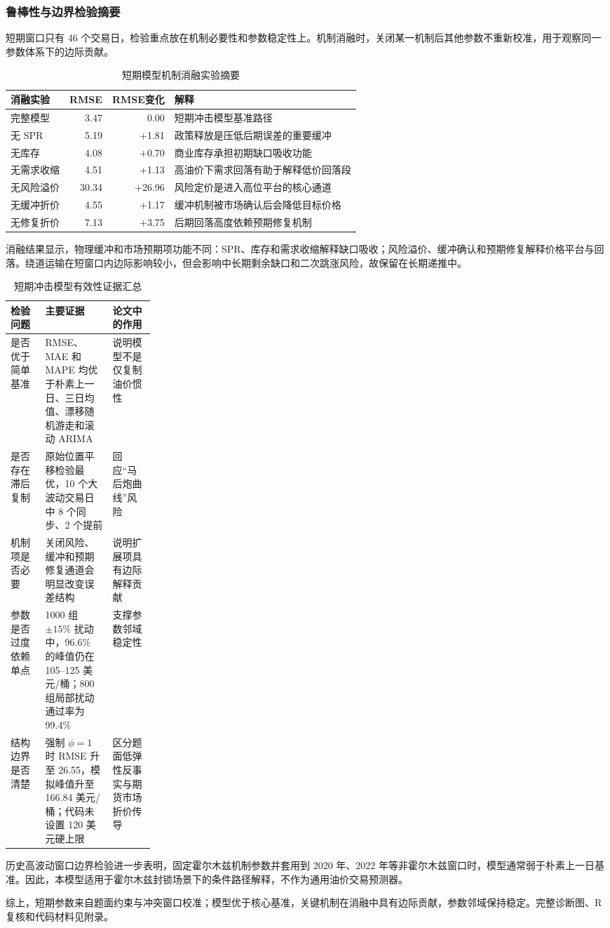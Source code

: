 \FloatBarrier

\subsubsection{鲁棒性与边界检验摘要}

短期窗口只有 46 个交易日，检验重点放在机制必要性和参数稳定性上。机制消融时，关闭某一机制后其他参数不重新校准，用于观察同一参数体系下的边际贡献。

\begin{table}[!htbp]
\centering
\caption{短期模型机制消融实验摘要}
\begin{tabularx}{\linewidth}{l r r X}
\toprule
消融实验 & RMSE & RMSE变化 & 解释 \\
\midrule
完整模型 & 3.47 & 0.00 & 短期冲击模型基准路径 \\
无 SPR & 5.19 & +1.81 & 政策释放是压低后期误差的重要缓冲 \\
无库存 & 4.08 & +0.70 & 商业库存承担初期缺口吸收功能 \\
无需求收缩 & 4.51 & +1.13 & 高油价下需求回落有助于解释低价回落段 \\
无风险溢价 & 30.34 & +26.96 & 风险定价是进入高位平台的核心通道 \\
无缓冲折价 & 4.55 & +1.17 & 缓冲机制被市场确认后会降低目标价格 \\
无修复折价 & 7.13 & +3.75 & 后期回落高度依赖预期修复机制 \\
\bottomrule
\end{tabularx}
\end{table}

消融结果显示，物理缓冲和市场预期项功能不同：SPR、库存和需求收缩解释缺口吸收；风险溢价、缓冲确认和预期修复解释价格平台与回落。绕道运输在短窗口内边际影响较小，但会影响中长期剩余缺口和二次跳涨风险，故保留在长期递推中。

\begin{table}[!htbp]
\centering
\caption{短期冲击模型有效性证据汇总}
\begin{tabularx}{\linewidth}{p{0.24\linewidth}X X}
\toprule
检验问题 & 主要证据 & 论文中的作用 \\
\midrule
是否优于简单基准 & RMSE、MAE 和 MAPE 均优于朴素上一日、三日均值、漂移随机游走和滚动 ARIMA & 说明模型不是仅复制油价惯性 \\
是否存在滞后复制 & 原始位置平移检验最优，10 个大波动交易日中 8 个同步、2 个提前 & 回应“马后炮曲线”风险 \\
机制项是否必要 & 关闭风险、缓冲和预期修复通道会明显改变误差结构 & 说明扩展项具有边际解释贡献 \\
参数是否过度依赖单点 & 1000 组 \(\pm15\%\) 扰动中，96.6\% 的峰值仍在 105--125 美元/桶；800 组局部扰动通过率为 99.4\% & 支撑参数邻域稳定性 \\
结构边界是否清楚 & 强制 \(\phi=1\) 时 RMSE 升至 26.55，模拟峰值升至 166.84 美元/桶；代码未设置 120 美元硬上限 & 区分题面低弹性反事实与期货市场折价传导 \\
\bottomrule
\end{tabularx}
\end{table}

历史高波动窗口边界检验进一步表明，固定霍尔木兹机制参数并套用到 2020 年、2022 年等非霍尔木兹窗口时，模型通常弱于朴素上一日基准。因此，本模型适用于霍尔木兹封锁场景下的条件路径解释，不作为通用油价交易预测器。

综上，短期参数来自题面约束与冲突窗口校准；模型优于核心基准，关键机制在消融中具有边际贡献，参数邻域保持稳定。完整诊断图、R 复核和代码材料见附录。
